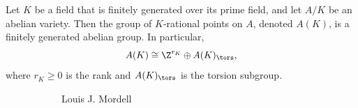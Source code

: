\begin{frame}
	\begin{thm}
	Let $K$ be a field that is finitely generated over its prime field, and let $A/K$ be an abelian variety. Then the group of $K$-rational points on $A$, denoted $A(K)$, is a finitely generated abelian group. In particular,
		\[
		A(K) \cong \Z^{r_K} \oplus A(K)_\tors,
		\]
	where $r_K \geq 0$ is the rank and $A(K)_\tors$ is the torsion subgroup. 
	\end{thm}
	\begin{figure}[h]
	\centering
	\begin{subfigure}{0.3\textwidth}
	\captionsetup{labelformat=empty}
	\centering
	\caption{Louis J. Mordell}
	\end{subfigure}
	\begin{subfigure}{0.3\textwidth}
	\captionsetup{labelformat=empty}
	\centering

\end{subfigure}
\end{figure}
\end{frame}

